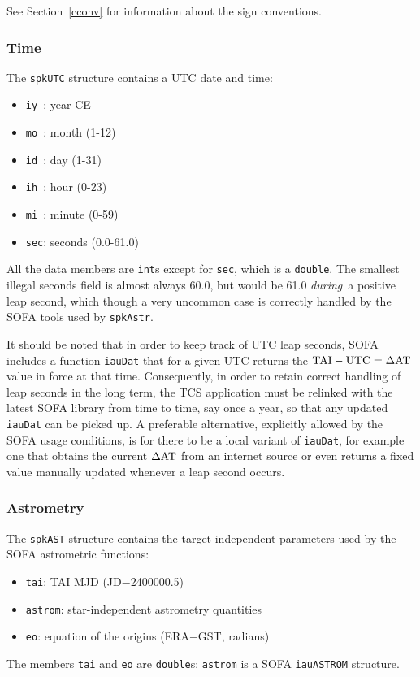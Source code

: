 \documentclass[11pt,fleqn,twoside,\paper]{article}
\renewcommand{\_}{{\tt\char'137}}     %
\begin{document}
See Section~\ref{cconv} for information about the sign
conventions.

\subsubsection{Time}
\label{time}

The {\tt spkUTC} structure contains a UTC date and time:
\begin{itemize}
\item {\tt iy }: year CE
\item {\tt mo }: month (1-12)
\item {\tt id }: day (1-31)
\item {\tt ih }: hour (0-23)
\item {\tt mi }: minute (0-59)
\item {\tt sec}: seconds (0.0-61.0)
\end{itemize}
All the data members are {\tt int}s except for {\tt sec}, which is
a {\tt double}. The smallest illegal seconds field
is almost always 60.0, but would be 61.0 {\it during}\
a positive leap
second, which though a very
uncommon case is correctly handled by the SOFA
tools used by {\tt spkAstr}.

It should be noted that in order to keep track of UTC leap
seconds, SOFA includes a function {\tt iauDat} that for a
given UTC returns the ${\rm TAI}-{\rm UTC}=\Delta{\rm AT}$
value in force at
that time.  Consequently, in order to retain
correct handling of leap seconds in the long term,
the TCS application must be relinked with the latest SOFA library
from time to time, say once a year, so that any updated
{\tt iauDat} can be picked up.  A preferable alternative,
explicitly allowed by the SOFA usage conditions, is for there
to be a local variant of {\tt iauDat}, for example one that
obtains the current $\Delta{\rm AT}$ from an internet source
or even returns a fixed value manually updated whenever a
leap second occurs.

\subsubsection{Astrometry}
\label{ast}

The {\tt spkAST} structure contains the target-independent
parameters used by the SOFA astrometric functions:
\begin{itemize}
\item {\tt tai}: TAI MJD (JD$-$2400000.5)
\item {\tt astrom}: star-independent astrometry quantities
\item {\tt eo}: equation of the origins (ERA$-$GST, radians)
\end{itemize}
The members {\tt tai} and {\tt eo} are {\tt double}s;
{\tt astrom} is a SOFA {\tt iauASTROM} structure.
\end{document}
